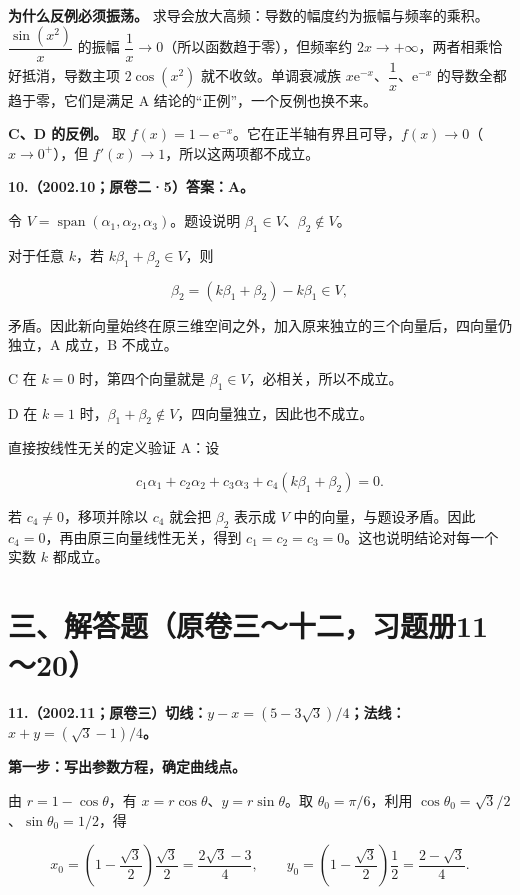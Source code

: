 \documentclass[UTF8,11pt,fontset=windows]{ctexart}
\begin{document}
\textbf{为什么反例必须振荡。} 求导会放大高频：导数的幅度约为振幅与频率的乘积。$\dfrac{\sin(x^2)}{x}$ 的振幅 $\dfrac{1}{x}\to0$（所以函数趋于零），但频率约 $2x\to+\infty$，两者相乘恰好抵消，导数主项 $2\cos(x^2)$ 就不收敛。单调衰减族 $x\mathrm e^{-x}$、$\dfrac{1}{x}$、$\mathrm e^{-x}$ 的导数全都趋于零，它们是满足 A 结论的“正例”，一个反例也换不来。

\textbf{C、D 的反例。} 取 $f(x)=1-\mathrm e^{-x}$。它在正半轴有界且可导，$f(x)\to0$（$x\to0^+$），但 $f'(x)\to1$，所以这两项都不成立。

\clearpage

\textbf{10.（2002.10；原卷二·5）答案：A。}

令 $V=\operatorname{span}(\alpha_1,\alpha_2,\alpha_3)$。题设说明 $\beta_1\in V$、$\beta_2\notin V$。

对于任意 $k$，若 $k\beta_1+\beta_2\in V$，则

$$
\beta_2=(k\beta_1+\beta_2)-k\beta_1\in V,
$$

矛盾。因此新向量始终在原三维空间之外，加入原来独立的三个向量后，四向量仍独立，A 成立，B 不成立。

C 在 $k=0$ 时，第四个向量就是 $\beta_1\in V$，必相关，所以不成立。

D 在 $k=1$ 时，$\beta_1+\beta_2\notin V$，四向量独立，因此也不成立。

直接按线性无关的定义验证 A：设

$$
c_1\alpha_1+c_2\alpha_2+c_3\alpha_3+c_4(k\beta_1+\beta_2)=0.
$$

若 $c_4\ne0$，移项并除以 $c_4$ 就会把 $\beta_2$ 表示成 $V$ 中的向量，与题设矛盾。因此 $c_4=0$，再由原三向量线性无关，得到 $c_1=c_2=c_3=0$。这也说明结论对每一个实数 $k$ 都成立。

\clearpage

\section*{三、解答题（原卷三～十二，习题册11～20）}

\textbf{11.（2002.11；原卷三）切线：$y-x=(5-3\sqrt3)/4$；法线：$x+y=(\sqrt3-1)/4$。}

\textbf{第一步：写出参数方程，确定曲线点。}

由 $r=1-\cos\theta$，有 $x=r\cos\theta$、$y=r\sin\theta$。取 $\theta_0=\pi/6$，利用 $\cos\theta_0=\sqrt3/2$、$\sin\theta_0=1/2$，得

$$
x_0=\left(1-\frac{\sqrt3}{2}\right)\frac{\sqrt3}{2}
=\frac{2\sqrt3-3}{4},
\qquad
y_0=\left(1-\frac{\sqrt3}{2}\right)\frac12
=\frac{2-\sqrt3}{4}.
$$
\end{document}
